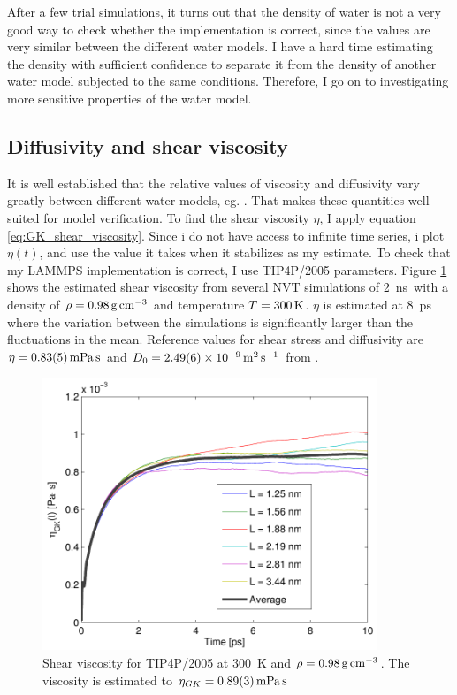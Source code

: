 After a few trial simulations, it turns out that the density of water is not a very good way to check whether the implementation is correct, since the values are very similar between the different water models. I have a hard time estimating the density with sufficient confidence to separate it from the density of another water model subjected to the same conditions. Therefore, I go on to investigating more sensitive properties of the water model.

\subsection{Diffusivity and shear viscosity}
It is well established that the relative values of viscosity and diffusivity vary greatly between different water models, eg. \cite{Gonzalez2010,Tazi2012}. That makes these quantities well suited for model verification. To find the shear viscosity $\eta$, I apply equation \ref{eq:GK_shear_viscosity}. Since i do not have access to infinite time series, i plot $\eta(t)$, and use the value it takes when it stabilizes as my estimate. To check that my LAMMPS implementation is correct, I use TIP4P/2005 parameters.  Figure \ref{fig:shear_viscosity_tip4p/2005} shows the estimated shear viscosity from several NVT simulations of \SI{2}{\nano\second} with a density of $\rho = \text{\SI{0.98}{\gram\per\cubic\cm}}$ and temperature $T=\text{\SI{300}{\kelvin}}$. $\eta$ is estimated at \SI{8}{\pico\second} where the variation between the simulations is significantly larger than the fluctuations in the mean. Reference values for shear stress and diffusivity are $\eta = \text{\SI{0.83 \pm 0.05}{\milli\pascal\second}}$ and $D_0 = \text{\SI{2.49 \pm 0.06d-9}{\metre\squared\per\second}}$ from \cite{Tazi2012}.

\begin{figure}
\centering
\includegraphics[width=10cm]{../figures/thesis/viscosity_green_kubo_tip4p_2005.pdf}
\caption{Shear viscosity for TIP4P/2005 at \SI{300}{\kelvin} and $\rho = \text{\SI{0.98}{\gram\per\cubic\cm}}$. The viscosity is estimated to $\eta_{GK} = \text{\SI{0.89\pm0.03}{\milli\pascal\second}}$}
\label{fig:shear_viscosity_tip4p/2005}
\end{figure}

